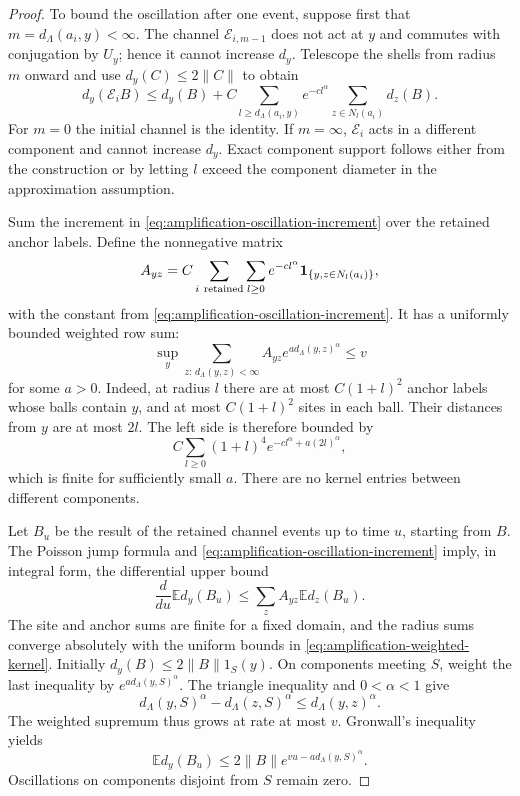 \begin{proof}
To bound the oscillation after one event, suppose first that
$m=d_\Lambda(a_i,y)<\infty$.  The channel $\mathcal E_{i,m-1}$
does not act at $y$ and commutes with conjugation by $U_y$; hence it
cannot increase $d_y$.  Telescope the shells from radius $m$ onward
and use $d_y(C)\le2\|C\|$ to obtain
\begin{equation}\label{eq:amplification-oscillation-increment}
 d_y(\mathcal E_i B)\le d_y(B)+
 C\sum_{l\ge d_\Lambda(a_i,y)}e^{-c l^\alpha}
       \sum_{z\in N_l(a_i)}d_z(B).
\end{equation}
For $m=0$ the initial channel is the identity.  If $m=\infty$,
$\mathcal E_i$ acts in a different component and cannot increase
$d_y$.  Exact component support follows either from the construction
or by letting $l$ exceed the component diameter in the approximation
assumption.

Sum the increment in
\eqref{eq:amplification-oscillation-increment} over the retained
anchor labels.  Define the nonnegative matrix
\[
 A_{yz}=C\sum_{i\ {\rm retained}}\sum_{l\ge0}
 e^{-cl^\alpha}\mathbf1_{\{y,z\in N_l(a_i)\}},
\]
with the constant from \eqref{eq:amplification-oscillation-increment}.
It has a uniformly bounded weighted row sum:
\begin{equation}\label{eq:amplification-weighted-kernel}
 \sup_y\sum_{z:\,d_\Lambda(y,z)<\infty}
 A_{yz}e^{a d_\Lambda(y,z)^\alpha}\le v
\end{equation}
for some $a>0$.  Indeed, at radius $l$ there are at most
$C(1+l)^2$ anchor labels whose balls contain $y$, and at most
$C(1+l)^2$ sites in each ball.  Their distances from $y$ are at most
$2l$.  The left side is therefore bounded by
\[
 C\sum_{l\ge0}(1+l)^4e^{-c l^\alpha+a(2l)^\alpha},
\]
which is finite for sufficiently small $a$.  There are no kernel
entries between different components.

Let $B_u$ be the result of the retained channel events up to time $u$,
starting from $B$.  The Poisson jump formula and
\eqref{eq:amplification-oscillation-increment} imply, in integral
form, the differential upper bound
\[
 \frac{d}{du}\mathbb E d_y(B_u)
 \le\sum_z A_{yz}\mathbb E d_z(B_u).
\]
The site and anchor sums are finite for a fixed domain, and the radius
sums converge absolutely with the uniform bounds in
\eqref{eq:amplification-weighted-kernel}.
Initially $d_y(B)\le2\|B\|1_S(y)$.  On components meeting $S$,
weight the last inequality by $e^{a d_\Lambda(y,S)^\alpha}$.
The triangle inequality and $0<\alpha<1$ give
\[
 d_\Lambda(y,S)^\alpha-d_\Lambda(z,S)^\alpha
 \le d_\Lambda(y,z)^\alpha.
\]
The weighted supremum thus grows at rate at most $v$.
Gronwall's inequality yields
\begin{equation}\label{eq:amplification-propagation}
 \mathbb E d_y(B_u)
 \le2\|B\|e^{vu-a d_\Lambda(y,S)^\alpha}.
\end{equation}
Oscillations on components disjoint from $S$ remain zero.


\end{proof}
